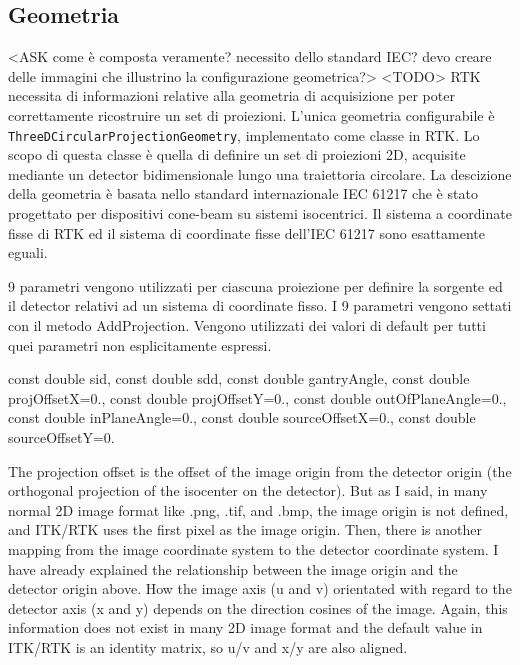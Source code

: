 \documentclass[a4paper,12pt, doubleside]{report}
\begin{document}
            \subsection{Geometria}
                \par
                    <ASK come è composta veramente? necessito dello standard IEC? devo creare delle immagini che illustrino la configurazione geometrica?> <TODO>
                    RTK necessita di informazioni relative alla geometria di acquisizione per poter correttamente ricostruire un set di proiezioni. L'unica geometria configurabile è \texttt{ ThreeDCircularProjectionGeometry}, implementato come classe in RTK.
                    Lo scopo di questa classe è quella di definire un set di proiezioni 2D, acquisite mediante un detector bidimensionale lungo una traiettoria circolare. La descizione della geometria è basata nello standard internazionale IEC 61217 che è stato progettato per dispositivi cone-beam su sistemi isocentrici. Il sistema a coordinate fisse di RTK ed il sistema di coordinate fisse dell'IEC 61217 sono esattamente eguali. 
                    
                    9 parametri vengono utilizzati per ciascuna proiezione per definire la sorgente ed il detector relativi ad un sistema di coordinate fisso. I 9 parametri vengono settati con il metodo AddProjection. Vengono utilizzati dei valori di default per tutti quei parametri non esplicitamente espressi.
                        
                    const double sid, const double sdd, const double gantryAngle, const double projOffsetX=0., const double projOffsetY=0., const double outOfPlaneAngle=0., const double inPlaneAngle=0., const double sourceOffsetX=0., const double sourceOffsetY=0.
                        
                    The projection offset is the offset of the image origin from the
                    detector origin (the orthogonal projection of the isocenter on the
                    detector). But as I said, in many normal 2D image
                    format like .png, .tif, and .bmp, the image origin is not defined, and
                    ITK/RTK uses the first pixel as the image origin.
                    Then, there is another mapping from the image coordinate system to the
                    detector coordinate system. I have already explained the relationship
                    between the image origin and the detector origin above. How the image
                    axis (u and v) orientated with regard to the detector axis (x and y)
                    depends on the direction cosines of the image. Again, this information
                    does not exist in many 2D image format and the default value in
                    ITK/RTK is an identity matrix, so u/v and x/y are also aligned.\cite{rtk-users-proj-offset}
                
\end{document}
